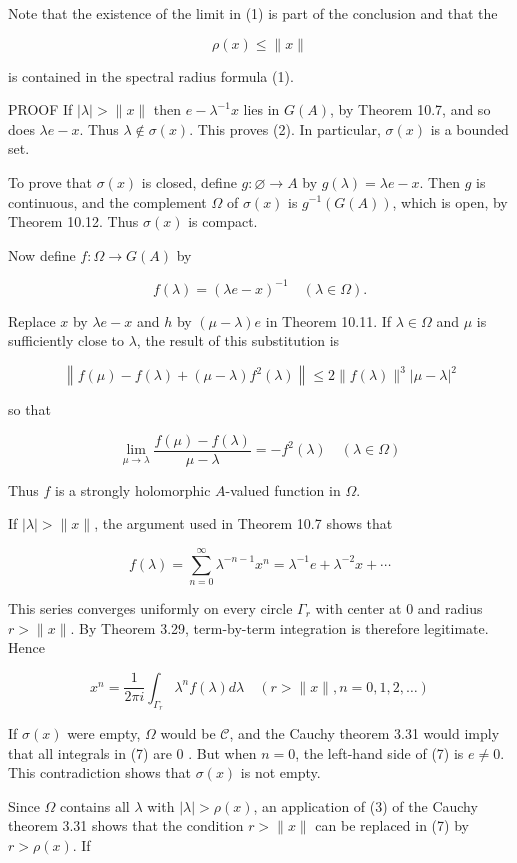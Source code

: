 \documentclass[10pt]{article}
\begin{document}
Note that the existence of the limit in (1) is part of the conclusion and that the

$$
\rho(x) \leq\|x\|
$$

is contained in the spectral radius formula (1).

PROOF If $|\lambda|>\|x\|$ then $e-\lambda^{-1} x$ lies in $G(A)$, by Theorem 10.7, and so does $\lambda e-x$. Thus $\lambda \notin \sigma(x)$. This proves (2). In particular, $\sigma(x)$ is a bounded set.

To prove that $\sigma(x)$ is closed, define $g: \varnothing \rightarrow A$ by $g(\lambda)=\lambda e-x$. Then $g$ is continuous, and the complement $\Omega$ of $\sigma(x)$ is $g^{-1}(G(A))$, which is open, by Theorem 10.12. Thus $\sigma(x)$ is compact.

Now define $f: \Omega \rightarrow G(A)$ by

$$
f(\lambda)=(\lambda e-x)^{-1} \quad(\lambda \in \Omega) .
$$

Replace $x$ by $\lambda e-x$ and $h$ by $(\mu-\lambda) e$ in Theorem 10.11. If $\lambda \in \Omega$ and $\mu$ is sufficiently close to $\lambda$, the result of this substitution is

$$
\left\|f(\mu)-f(\lambda)+(\mu-\lambda) f^{2}(\lambda)\right\| \leq 2\|f(\lambda)\|^{3}|\mu-\lambda|^{2}
$$

so that

$$
\lim _{\mu \rightarrow \lambda} \frac{f(\mu)-f(\lambda)}{\mu-\lambda}=-f^{2}(\lambda) \quad(\lambda \in \Omega)
$$

Thus $f$ is a strongly holomorphic $A$-valued function in $\Omega$.

If $|\lambda|>\|x\|$, the argument used in Theorem 10.7 shows that

$$
f(\lambda)=\sum_{n=0}^{\infty} \lambda^{-n-1} x^{n}=\lambda^{-1} e+\lambda^{-2} x+\cdots
$$

This series converges uniformly on every circle $\Gamma_{r}$ with center at 0 and radius $r>\|x\|$. By Theorem 3.29, term-by-term integration is therefore legitimate. Hence

$$
x^{n}=\frac{1}{2 \pi i} \int_{\Gamma_{r}} \lambda^{n} f(\lambda) d \lambda \quad(r>\|x\|, n=0,1,2, \ldots)
$$

If $\sigma(x)$ were empty, $\Omega$ would be $\mathscr{C}$, and the Cauchy theorem 3.31 would imply that all integrals in (7) are 0 . But when $n=0$, the left-hand side of (7) is $e \neq 0$. This contradiction shows that $\sigma(x)$ is not empty.

Since $\Omega$ contains all $\lambda$ with $|\lambda|>\rho(x)$, an application of (3) of the Cauchy theorem 3.31 shows that the condition $r>\|x\|$ can be replaced in (7) by $r>\rho(x)$. If
\end{document}
